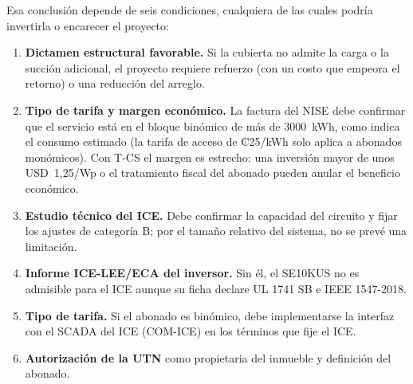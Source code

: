\documentclass[12pt]{article}
\begin{document}
Esa conclusión depende de seis condiciones, cualquiera de las cuales podría invertirla o encarecer el proyecto:
\begin{enumerate}
\item \textbf{Dictamen estructural favorable.} Si la cubierta no admite la carga o la succión adicional, el proyecto requiere refuerzo (con un costo que empeora el retorno) o una reducción del arreglo.
\item \textbf{Tipo de tarifa y margen económico.} La factura del NISE debe confirmar que el servicio está en el bloque binómico de más de 3000~kWh, como indica el consumo estimado (la tarifa de acceso de ₡25/kWh solo aplica a abonados monómicos). Con T-CS el margen es estrecho: una inversión mayor de unos USD~1,25/Wp o el tratamiento fiscal del abonado pueden anular el beneficio económico.
\item \textbf{Estudio técnico del ICE.} Debe confirmar la capacidad del circuito y fijar los ajustes de categoría B; por el tamaño relativo del sistema, no se prevé una limitación.
\item \textbf{Informe ICE-LEE/ECA del inversor.} Sin él, el SE10KUS no es admisible para el ICE aunque su ficha declare UL 1741 SB e IEEE 1547-2018.
\item \textbf{Tipo de tarifa.} Si el abonado es binómico, debe implementarse la interfaz con el SCADA del ICE (COM-ICE) en los términos que fije el ICE.
\item \textbf{Autorización de la UTN} como propietaria del inmueble y definición del abonado.
\end{enumerate}

\end{document}
